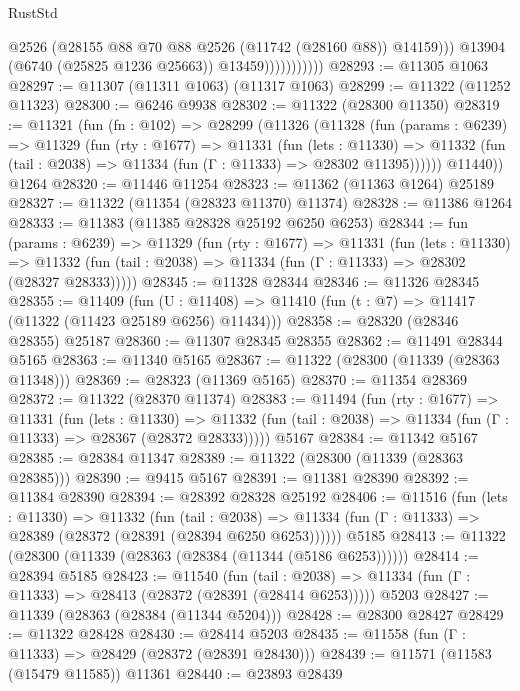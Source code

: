 \begin{lexlean}{RustStd}
\begin{coremodule}
                              @2526
                              (@28155 @88 @70 @88 @2526 (@11742 (@28160 @88)) @14159)))
                          @13904
                          (@6740 (@25825 @1236 @25663))
                          @13459)))))))))))
@28293 := @11305 @1063
@28297 := @11307 (@11311 @1063) (@11317 @1063)
@28299 := @11322 (@11252 @11323)
@28300 := @6246 @9938
@28302 := @11322 (@28300 @11350)
@28319 := @11321
    (fun (fn : @102) =>
    @28299
      (@11326
        (@11328
          (fun (params : @6239) =>
          @11329
            (fun (rty : @1677) =>
            @11331
              (fun (lets : @11330) =>
              @11332 (fun (tail : @2038) => @11334 (fun (Γ : @11333) => @28302 @11395))))))
        @11440))
    @1264
@28320 := @11446 @11254
@28323 := @11362 (@11363 @1264) @25189
@28327 := @11322 (@11354 (@28323 @11370) @11374)
@28328 := @11386 @1264
@28333 := @11383 (@11385 @28328 @25192 @6250 @6253)
@28344 := fun (params : @6239) =>
  @11329
    (fun (rty : @1677) =>
    @11331
      (fun (lets : @11330) =>
      @11332 (fun (tail : @2038) => @11334 (fun (Γ : @11333) => @28302 (@28327 @28333)))))
@28345 := @11328 @28344
@28346 := @11326 @28345
@28355 := @11409
    (fun (U : @11408) => @11410 (fun (t : @7) => @11417 (@11322 (@11423 @25189 @6256) @11434)))
@28358 := @28320 (@28346 @28355) @25187
@28360 := @11307 @28345 @28355
@28362 := @11491 @28344 @5165
@28363 := @11340 @5165
@28367 := @11322 (@28300 (@11339 (@28363 @11348)))
@28369 := @28323 (@11369 @5165)
@28370 := @11354 @28369
@28372 := @11322 (@28370 @11374)
@28383 := @11494
    (fun (rty : @1677) =>
    @11331
      (fun (lets : @11330) =>
      @11332 (fun (tail : @2038) => @11334 (fun (Γ : @11333) => @28367 (@28372 @28333)))))
    @5167
@28384 := @11342 @5167
@28385 := @28384 @11347
@28389 := @11322 (@28300 (@11339 (@28363 @28385)))
@28390 := @9415 @5167
@28391 := @11381 @28390
@28392 := @11384 @28390
@28394 := @28392 @28328 @25192
@28406 := @11516
    (fun (lets : @11330) =>
    @11332
      (fun (tail : @2038) =>
      @11334 (fun (Γ : @11333) => @28389 (@28372 (@28391 (@28394 @6250 @6253))))))
    @5185
@28413 := @11322 (@28300 (@11339 (@28363 (@28384 (@11344 (@5186 @6253))))))
@28414 := @28394 @5185
@28423 := @11540
    (fun (tail : @2038) => @11334 (fun (Γ : @11333) => @28413 (@28372 (@28391 (@28414 @6253)))))
    @5203
@28427 := @11339 (@28363 (@28384 (@11344 @5204)))
@28428 := @28300 @28427
@28429 := @11322 @28428
@28430 := @28414 @5203
@28435 := @11558 (fun (Γ : @11333) => @28429 (@28372 (@28391 @28430)))
@28439 := @11571 (@11583 (@15479 @11585)) @11361
@28440 := @23893 @28439

\end{coremodule}
\end{lexlean}
